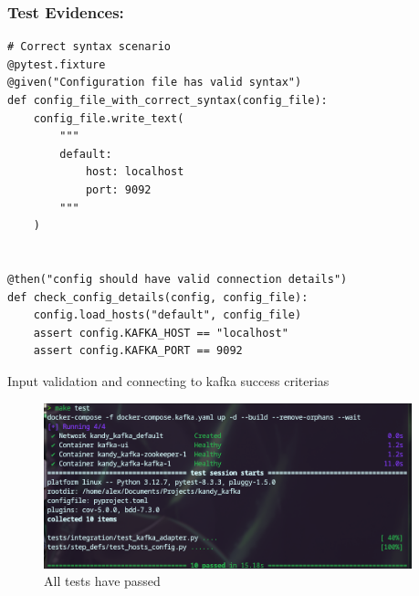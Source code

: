 \documentclass[10pt , a4paper]{report}
\newenvironment{code}{\captionsetup{type=listing}}{}
\begin{document}
\newpage
\subsubsection{Test Evidences:}

\begin{code}
  \begin{verbatim}
# Correct syntax scenario
@pytest.fixture
@given("Configuration file has valid syntax")
def config_file_with_correct_syntax(config_file):
    config_file.write_text(
        """
        default:
            host: localhost
            port: 9092
        """
    )


@then("config should have valid connection details")
def check_config_details(config, config_file):
    config.load_hosts("default", config_file)
    assert config.KAFKA_HOST == "localhost"
    assert config.KAFKA_PORT == 9092
\end{verbatim}
\caption{Input validation and connecting to kafka success criterias}
\end{code}

\begin{figure}[htbp]
  \begin{center}
    \includegraphics[width=0.95\textwidth]{imgs/FinalTestData.png}
  \end{center}
  \caption{All tests have passed}\label{fig:}
\end{figure}
\end{document}

